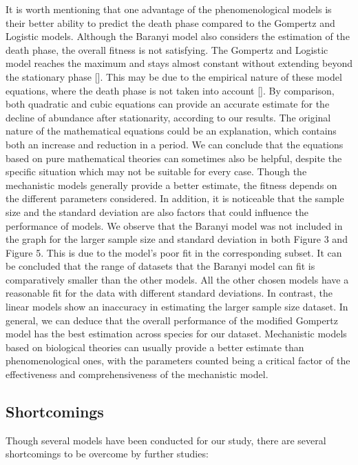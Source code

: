 \documentclass[11pt, oneside]{article}
\begin{document}
	\noindent It is worth mentioning that one advantage of the phenomenological models is their better ability to predict the death phase compared to the Gompertz and Logistic models. Although the Baranyi model also considers the estimation of the death phase, the overall fitness is not satisfying. The Gompertz and Logistic model reaches the maximum and stays almost constant without extending beyond the stationary phase [\cite{whiting1992quantitative}]. This may be due to the empirical nature of these model equations, where the death phase is not taken into account [\cite{chowdhury2007validity}]. By comparison, both quadratic and cubic equations can provide an accurate estimate for the decline of abundance after stationarity, according to our results. The original nature of the mathematical equations could be an explanation, which contains both an increase and reduction in a period. We can conclude that the equations based on pure mathematical theories can sometimes also be helpful, despite the specific situation which may not be suitable for every case. Though the mechanistic models generally provide a better estimate, the fitness depends on the different parameters considered. 
	\bigbreak
	\noindent In addition, it is noticeable that the sample size and the standard deviation are also factors that could influence the performance of models. We observe that the Baranyi model was not included in the graph for the larger sample size and standard deviation in both Figure 3 and Figure 5. This is due to the model's poor fit in the corresponding subset. It can be concluded that the range of datasets that the Baranyi model can fit is comparatively smaller than the other models. All the other chosen models have a reasonable fit for the data with different standard deviations. In contrast, the linear models show an inaccuracy in estimating the larger sample size dataset. 
	\bigbreak
	\noindent In general, we can deduce that the overall performance of the modified Gompertz model has the best estimation across species for our dataset. Mechanistic models based on biological theories can usually provide a better estimate than phenomenological ones, with the parameters counted being a critical factor of the effectiveness and comprehensiveness of the mechanistic model. 
	
	\subsection{Shortcomings}
	
	Though several models have been conducted for our study, there are several shortcomings to be overcome by further studies:
	
\end{document}
